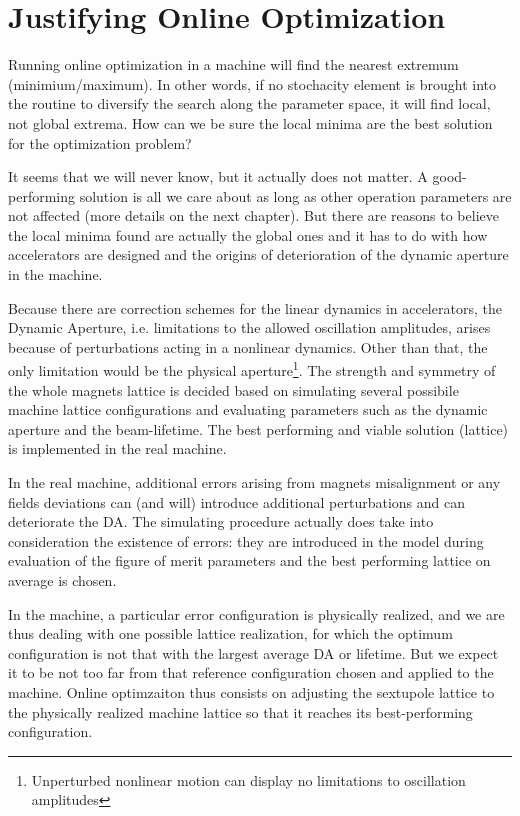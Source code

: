 \section{Justifying Online Optimization}
Running online optimization in a machine will find the nearest extremum (minimium/maximum). In other words, if no stochacity element is brought into the routine to diversify the search along the parameter space, it will find local, not global extrema. How can we be sure the local minima are the best solution for the optimization problem?

It seems that we will never know, but it actually does not matter. A good-performing solution is all we care about as long as other operation parameters are not affected (more details on the next chapter). But there are reasons to believe the local minima found are actually the global ones and it has to do with how accelerators are designed and the origins of deterioration of the dynamic aperture in the machine.

Because there are correction schemes for the linear dynamics in accelerators, the Dynamic Aperture, i.e. limitations to the allowed oscillation amplitudes,  arises because of perturbations acting in a nonlinear dynamics. Other than that, the only limitation would be the physical aperture\footnote{Unperturbed nonlinear motion can display no limitations to oscillation amplitudes}.  The strength and symmetry of the whole magnets lattice is decided based on simulating several possibile machine lattice configurations and evaluating parameters such as the dynamic aperture and the beam-lifetime. The best performing and viable solution (lattice) is implemented in the real machine.

In the real machine, additional errors arising from magnets misalignment or any fields deviations can (and will) introduce additional perturbations and can deteriorate the DA. The simulating procedure actually does take into consideration the existence of errors: they are introduced in the model during evaluation of the figure of merit parameters and the best performing lattice on average is chosen.

In the machine, a particular error configuration is physically realized, and we are thus dealing with one possible lattice realization, for which the optimum configuration is not that with the largest average DA or lifetime. But we expect it to be not too far from that reference configuration chosen and applied to the machine. Online optimzaiton thus consists on adjusting the sextupole lattice to the physically realized machine lattice so that it reaches its best-performing configuration.


